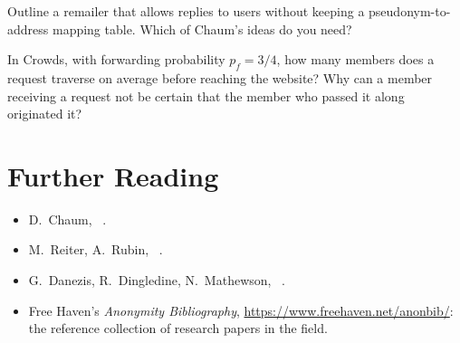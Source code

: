 \begin{esercizio}[2]\label{es:02-penet}
Outline a remailer that allows replies to users without keeping a pseudonym-to-address mapping table. Which of Chaum's ideas do you need?
\end{esercizio}

\begin{esercizio}[2]\label{es:02-crowds}
In Crowds, with forwarding probability $p_f = 3/4$, how many members does a request traverse on average before reaching the website? Why can a member receiving a request not be certain that the member who passed it along originated it?
\end{esercizio}

\section*{Further Reading}
\begin{itemize}
  \item D.~Chaum, ~\cite{chaum1981untraceable}.
  \item M.~Reiter, A.~Rubin, ~\cite{reiter1998crowds}.
  \item G.~Danezis, R.~Dingledine, N.~Mathewson, ~\cite{danezis2003mixminion}.
  \item Free Haven's \emph{Anonymity Bibliography}, \url{https://www.freehaven.net/anonbib/}: the reference collection of research papers in the field.
\end{itemize}
